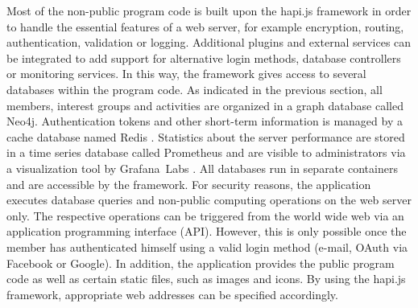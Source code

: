 \documentclass[12pt,numbers=noenddot,parskip,bibliography=totocnumbered,listof=totocnumbered,draft]{scrreprt}
\begin{document}
Most of the non-public program code is built upon the \mbox{hapi.js} \citep{hapijs} framework in order to handle the essential features of a web server, for example encryption, routing, authentication, validation or logging. Additional plugins and external services can be integrated to add support for alternative login methods, database controllers or monitoring services. In this way, the framework gives access to several databases within the program code. As indicated in the previous section, all members, interest groups and activities are organized in a graph database called \mbox{Neo4j}. Authentication tokens and other short-term information is managed by a cache database named \mbox{Redis} \citep{redis}. Statistics about the server performance are stored in a time series database called \mbox{Prometheus} \citep{prometheus} and are visible to administrators via a visualization tool by \mbox{Grafana Labs} \citep{grafana}. All databases run in separate containers and are accessible by the framework. For security reasons, the application executes database queries and non-public computing operations on the web server only. The respective operations can be triggered from the world wide web via an application programming interface (API). However, this is only possible once the member has authenticated himself using a valid login method (e-mail, \mbox{OAuth} via \mbox{Facebook} or \mbox{Google}). In addition, the application provides the public program code as well as certain static files, such as images and icons. By using the \mbox{hapi.js} framework, appropriate web addresses can be specified accordingly.
\end{document}
